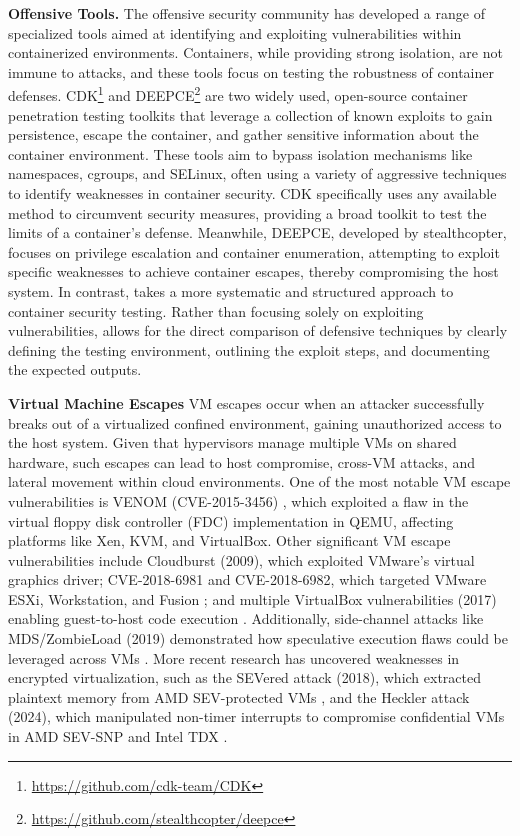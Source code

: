 \noindent\textbf{Offensive Tools.} The offensive security community has developed a range of specialized tools aimed at identifying and exploiting vulnerabilities within containerized environments. Containers, while providing strong isolation, are not immune to attacks, and these tools focus on testing the robustness of container defenses. CDK\footnote{\url{https://github.com/cdk-team/CDK}} and DEEPCE\footnote{\url{https://github.com/stealthcopter/deepce}} are two widely used, open-source container penetration testing toolkits that leverage a collection of known exploits to gain persistence, escape the container, and gather sensitive information about the container environment. These tools aim to bypass isolation mechanisms like namespaces, cgroups, and SELinux, often using a variety of aggressive techniques to identify weaknesses in container security. CDK specifically uses any available method to circumvent security measures, providing a broad toolkit to test the limits of a container’s defense. Meanwhile, DEEPCE, developed by stealthcopter, focuses on privilege escalation and container enumeration, attempting to exploit specific weaknesses to achieve container escapes, thereby compromising the host system. In contrast, \houdini takes a more systematic and structured approach to container security testing. Rather than focusing solely on exploiting vulnerabilities, \houdini allows for the direct comparison of defensive techniques by clearly defining the testing environment, outlining the exploit steps, and documenting the expected outputs.

\noindent\textbf{Virtual Machine Escapes} VM escapes occur when an attacker successfully breaks out of a virtualized confined environment, gaining unauthorized access to the host system. Given that hypervisors manage multiple VMs on shared hardware, such escapes can lead to host compromise, cross-VM attacks, and lateral movement within cloud environments. One of the most notable VM escape vulnerabilities is VENOM (CVE-2015-3456) \cite{abdoul2018novel}, which exploited a flaw in the virtual floppy disk controller (FDC) implementation in QEMU, affecting platforms like Xen, KVM, and VirtualBox. Other significant VM escape vulnerabilities include Cloudburst (2009), which exploited VMware's virtual graphics driver; CVE-2018-6981 and CVE-2018-6982, which targeted VMware ESXi, Workstation, and Fusion \cite{vmware2018escape}; and multiple VirtualBox vulnerabilities (2017) enabling guest-to-host code execution \cite{virtualbox2017bugs}. Additionally, side-channel attacks like MDS/ZombieLoad (2019) demonstrated how speculative execution flaws could be leveraged across VMs \cite{mds2019attack}. More recent research has uncovered weaknesses in encrypted virtualization, such as the SEVered attack (2018), which extracted plaintext memory from AMD SEV-protected VMs \cite{severed2018}, and the Heckler attack (2024), which manipulated non-timer interrupts to compromise confidential VMs in AMD SEV-SNP and Intel TDX \cite{heckler2024}.

